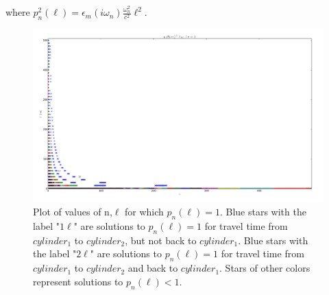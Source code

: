 \documentclass[a4paper]{article}
\begin{document}
\begin{center}
\hskip 73pt

where $p_n^{2}(\ell) =  \epsilon_m(i \omega_n) \frac{\omega_n^{2}}{c^{2}} \ell^{2}$. 
\begin{figure}[t!]
\begin{center}
\includegraphics[width=1.2\textwidth,scale=0.8]{plots/p_vs_n_l.png}
\hskip 43pt
\caption{Plot of values of n,$\ell$ for which $p_n(\ell)=1$.  Blue stars with
    the label "$1\ell$" are solutions to $p_n(\ell)=1$ for travel time from $cylinder_1$ to
    $cylinder_2$, but not back to $cylinder_1$. Blue stars with
    the label "$2\ell$" are solutions to $p_n(\ell)=1$ for travel time from $cylinder_1$ to
    $cylinder_2$ and back to $cylinder_1$. Stars of other colors represent
solutions to $p_n(\ell) < 1$.}
\label{eiz65}
\end{center}
\end{figure} 


\end{center}
\end{document}
